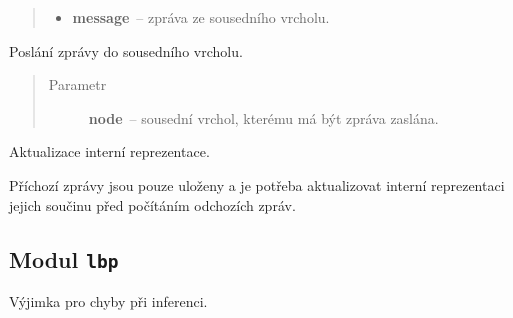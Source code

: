 \begin{fulllineitems}
\begin{fulllineitems}
\begin{quote}
\begin{description}
\begin{itemize}
\item {} 
\textbf{message}~-- zpráva ze sousedního vrcholu.

\end{itemize}

\end{description}\end{quote}

\end{fulllineitems}


\begin{fulllineitems}
\label{alex.infer:alex.infer.factor.alex.infer.node.DirichletFactorNode.message_to}
Poslání zprávy do sousedního vrcholu.
\begin{quote}\begin{description}
\item[{Parametr}] \leavevmode
\textbf{node}~-- sousední vrchol, kterému má být zpráva zaslána.

\end{description}\end{quote}

\end{fulllineitems}


\begin{fulllineitems}
\label{alex.infer:alex.infer.factor.alex.infer.node.DirichletFactorNode.update}
Aktualizace interní reprezentace.

Příchozí zprávy jsou pouze uloženy a je potřeba aktualizovat interní
reprezentaci jejich součinu před počítáním odchozích zpráv.

\end{fulllineitems}


\end{fulllineitems}



\subsection{Modul \texttt{lbp}}
\label{alex.infer:modul-lbp}

\begin{fulllineitems}
\label{alex.infer:alex.infer.factor.alex.infer.lbp.LBPError}
Výjimka pro chyby při inferenci.

\end{fulllineitems}

